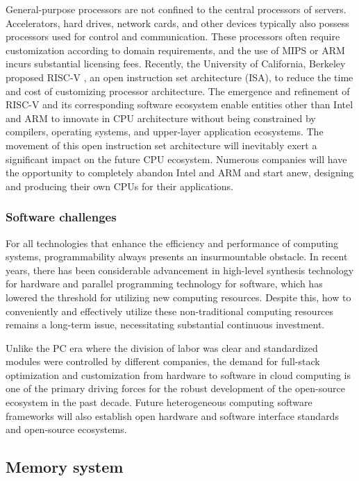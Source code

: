 General-purpose processors are not confined to the central processors of servers. Accelerators, hard drives, network cards, and other devices typically also possess processors used for control and communication. These processors often require customization according to domain requirements, and the use of MIPS or ARM incurs substantial licensing fees. Recently, the University of California, Berkeley proposed RISC-V \cite{asanovic2014instruction}, an open instruction set architecture (ISA), to reduce the time and cost of customizing processor architecture. The emergence and refinement of RISC-V and its corresponding software ecosystem enable entities other than Intel and ARM to innovate in CPU architecture without being constrained by compilers, operating systems, and upper-layer application ecosystems. The movement of this open instruction set architecture will inevitably exert a significant impact on the future CPU ecosystem. Numerous companies will have the opportunity to completely abandon Intel and ARM and start anew, designing and producing their own CPUs for their applications.

\subsubsection{Software challenges}

For all technologies that enhance the efficiency and performance of computing systems, programmability always presents an insurmountable obstacle. In recent years, there has been considerable advancement in high-level synthesis technology for hardware and parallel programming technology for software, which has lowered the threshold for utilizing new computing resources. Despite this, how to conveniently and effectively utilize these non-traditional computing resources remains a long-term issue, necessitating substantial continuous investment.

Unlike the PC era where the division of labor was clear and standardized modules were controlled by different companies, the demand for full-stack optimization and customization from hardware to software in cloud computing is one of the primary driving forces for the robust development of the open-source ecosystem in the past decade. Future heterogeneous computing software frameworks will also establish open hardware and software interface standards and open-source ecosystems.

\subsection{Memory system}

